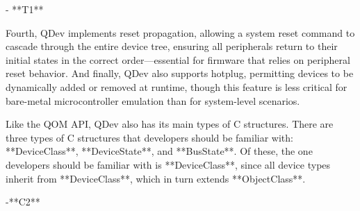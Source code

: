 - **T1**

Fourth, QDev implements reset propagation, allowing a system reset command 
to cascade through the entire device tree, ensuring all peripherals return to their 
initial states in the correct order—essential for firmware that relies on peripheral 
reset behavior. And finally, QDev also supports hotplug, permitting devices to be 
dynamically added or removed at runtime, though this feature is less critical for 
bare-metal microcontroller emulation than for system-level scenarios.

Like the QOM API, QDev also has its main types of C structures. There are 
three types of C structures that developers should be familiar with: **DeviceClass**, 
**DeviceState**, and **BusState**. Of these, the one developers should be familiar 
with is **DeviceClass**, since all device types inherit from **DeviceClass**, which 
in turn extends **ObjectClass**.

-**C2**